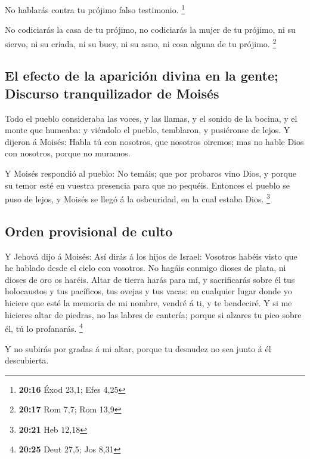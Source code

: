  No hablarás contra tu prójimo falso testimonio.
\footnote{\textbf{20:16} Éxod 23,1; Efes 4,25}

 No codiciarás la casa de tu prójimo, no codiciarás la
mujer de tu prójimo, ni su siervo, ni su criada, ni su buey, ni su asno,
ni cosa alguna de tu prójimo. \footnote{\textbf{20:17} Rom 7,7; Rom 13,9}

\hypertarget{el-efecto-de-la-apariciuxf3n-divina-en-la-gente-discurso-tranquilizador-de-moisuxe9s}{%
\subsection{El efecto de la aparición divina en la gente; Discurso
tranquilizador de
Moisés}\label{el-efecto-de-la-apariciuxf3n-divina-en-la-gente-discurso-tranquilizador-de-moisuxe9s}}

 Todo el pueblo consideraba las voces, y las llamas, y el
sonido de la bocina, y el monte que humeaba: y viéndolo el pueblo,
temblaron, y pusiéronse de lejos.  Y dijeron á Moisés:
Habla tú con nosotros, que nosotros oiremos; mas no hable Dios con
nosotros, porque no muramos.

 Y Moisés respondió al pueblo: No temáis; que por probaros
vino Dios, y porque su temor esté en vuestra presencia para que no
pequéis.  Entonces el pueblo se puso de lejos, y Moisés se
llegó á la osbcuridad, en la cual estaba Dios. \footnote{\textbf{20:21}
  Heb 12,18}

\hypertarget{orden-provisional-de-culto}{%
\subsection{Orden provisional de
culto}\label{orden-provisional-de-culto}}

 Y Jehová dijo á Moisés: Así dirás á los hijos de Israel:
Vosotros habéis visto que he hablado desde el cielo con vosotros.
 No hagáis conmigo dioses de plata, ni dioses de oro os
haréis.  Altar de tierra harás para mí, y sacrificarás
sobre él tus holocaustos y tus pacíficos, tus ovejas y tus vacas: en
cualquier lugar donde yo hiciere que esté la memoria de mi nombre,
vendré á ti, y te bendeciré.  Y si me hicieres altar de
piedras, no las labres de cantería; porque si alzares tu pico sobre él,
tú lo profanarás. \footnote{\textbf{20:25} Deut 27,5; Jos 8,31}

 Y no subirás por gradas á mi altar, porque tu desnudez no
sea junto á él descubierta.

